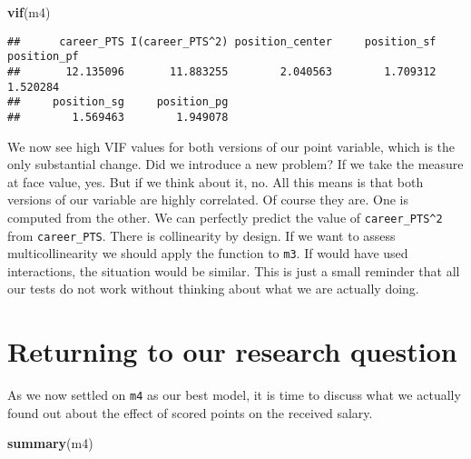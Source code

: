 \documentclass[
]{book}
\newenvironment{Shaded}{\begin{snugshade}}{\end{snugshade}}
\newcommand{\FunctionTok}[1]{\textcolor[rgb]{0.13,0.29,0.53}{\textbf{#1}}}
\newcommand{\NormalTok}[1]{#1}
\begin{document}
\begin{Shaded}
\begin{Highlighting}[]
\FunctionTok{vif}\NormalTok{(m4)}
\end{Highlighting}
\end{Shaded}

\begin{verbatim}
##      career_PTS I(career_PTS^2) position_center     position_sf     position_pf 
##       12.135096       11.883255        2.040563        1.709312        1.520284 
##     position_sg     position_pg 
##        1.569463        1.949078
\end{verbatim}

We now see high VIF values for both versions of our point variable, which is the
only substantial change. Did we introduce a
new problem? If we take the measure at face value, yes. But if we think about
it, no. All this means is that both versions of our variable are highly
correlated. Of course they are. One is computed from the other. We can
perfectly predict the value of \texttt{career\_PTS\^{}2} from \texttt{career\_PTS}. There is
collinearity by design. If we want to assess multicollinearity we should apply
the function to \texttt{m3}. If would have used interactions, the situation would be
similar. This is just a small reminder that all our tests do not work without
thinking about what we are actually doing.

\hypertarget{returning-to-our-research-question-2}{%
\section{Returning to our research question}\label{returning-to-our-research-question-2}}

As we now settled on \texttt{m4} as our best model, it is time to discuss what we
actually found out about the effect of scored points on the received salary.

\begin{Shaded}
\begin{Highlighting}[]
\FunctionTok{summary}\NormalTok{(m4)}
\end{Highlighting}
\end{Shaded}
\end{document}
